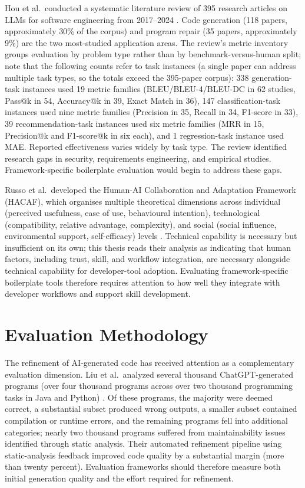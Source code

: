 \documentclass[12pt,a4paper]{report}
\begin{document}
Hou et al.\ conducted a systematic literature review of 395 research articles on LLMs for software engineering from 2017--2024 \parencite{hou2024llmse}. Code generation (118 papers, approximately 30\% of the corpus) and program repair (35 papers, approximately 9\%) are the two most-studied application areas. The review's metric inventory groups evaluation by problem type rather than by benchmark-versus-human split; note that the following counts refer to task instances (a single paper can address multiple task types, so the totals exceed the 395-paper corpus): 338 generation-task instances used 19 metric families (BLEU/BLEU-4/BLEU-DC in 62 studies, Pass@k in 54, Accuracy@k in 39, Exact Match in 36), 147 classification-task instances used nine metric families (Precision in 35, Recall in 34, F1-score in 33), 39 recommendation-task instances used six metric families (MRR in 15, Precision@k and F1-score@k in six each), and 1 regression-task instance used MAE. Reported effectiveness varies widely by task type. The review identified research gaps in security, requirements engineering, and empirical studies. Framework-specific boilerplate evaluation would begin to address these gaps.

Russo et al.\ developed the Human-AI Collaboration and Adaptation Framework (HACAF), which organises multiple theoretical dimensions across individual (perceived usefulness, ease of use, behavioural intention), technological (compatibility, relative advantage, complexity), and social (social influence, environmental support, self-efficacy) levels \parencite{russo2024navigating}. Technical capability is necessary but insufficient on its own; this thesis reads their analysis as indicating that human factors, including trust, skill, and workflow integration, are necessary alongside technical capability for developer-tool adoption. Evaluating framework-specific boilerplate tools therefore requires attention to how well they integrate with developer workflows and support skill development.

\section{Evaluation Methodology}

The refinement of {AI}-generated code has received attention as a complementary evaluation dimension. Liu et al.\ analyzed several thousand ChatGPT-generated programs (over four thousand programs across over two thousand programming tasks in Java and Python) \parencite{liu2024refining}. Of these programs, the majority were deemed correct, a substantial subset produced wrong outputs, a smaller subset contained compilation or runtime errors, and the remaining programs fell into additional categories; nearly two thousand programs suffered from maintainability issues identified through static analysis. Their automated refinement pipeline using static-analysis feedback improved code quality by a substantial margin (more than twenty percent). Evaluation frameworks should therefore measure both initial generation quality and the effort required for refinement.
\end{document}
